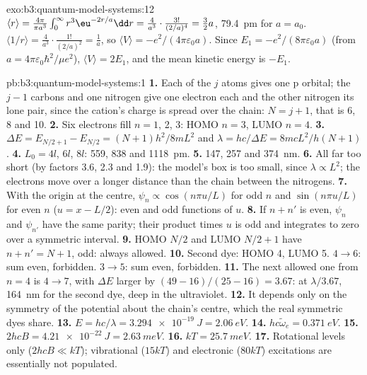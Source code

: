 \begin{solution}{exo:b3:quantum-model-systems:12}
$\langle r\rangle = \frac{4\pi}{\pi a^3}\int_0^\infty r^3\eu^{-2r/a}\dd r =
\frac{4}{a^3}\cdot\frac{3!}{(2/a)^4} = \frac32a$, \qty{79.4}{pm} for $a = a_0$.
$\langle 1/r\rangle = \frac{4}{a^3}\cdot\frac{1!}{(2/a)^2} = \frac1a$, so
$\langle V\rangle = -e^2/(4\pi\varepsilon_0a)$. Since $E_1 =
-e^2/(8\pi\varepsilon_0a)$ (from $a = 4\pi\varepsilon_0\hbar^2/\mu e^2$),
$\langle V\rangle = 2E_1$, and the mean kinetic energy is $-E_1$.
\end{solution}

\begin{solution}{pb:b3:quantum-model-systems:1}
\textbf{1.} Each of the $j$ atoms gives one p orbital; the $j - 1$ carbons and
one nitrogen give one electron each and the other nitrogen its lone pair,
since the cation's charge is spread over the chain: $N = j + 1$, that is 6,
8 and 10.
\textbf{2.} Six electrons fill $n = 1$, 2, 3: HOMO $n = 3$, LUMO $n = 4$.
\textbf{3.} $\Delta E = E_{N/2+1} - E_{N/2} = (N+1)h^2/8mL^2$ and $\lambda =
hc/\Delta E = 8mcL^2/h(N+1)$.
\textbf{4.} $L_0 = 4l$, $6l$, $8l$: 559, 838 and \qty{1118}{pm}.
\textbf{5.} 147, 257 and \qty{374}{nm}.
\textbf{6.} All far too short (by factors 3.6, 2.3 and 1.9): the model's box is too
small, since $\lambda \propto L^2$; the electrons move over a longer
distance than the chain between the nitrogens.
\textbf{7.} With the origin at the centre, $\psi_n \propto \cos(n\pi u/L)$ for
odd $n$ and $\sin(n\pi u/L)$ for even $n$ ($u = x - L/2$): even and odd
functions of $u$.
\textbf{8.} If $n + n'$ is even, $\psi_n$ and $\psi_{n'}$ have the same parity;
their product times $u$ is odd and integrates to zero over a symmetric
interval.
\textbf{9.} HOMO $N/2$ and LUMO $N/2 + 1$ have $n + n' = N + 1$, odd: always
allowed.
\textbf{10.} Second dye: HOMO 4, LUMO 5. $4 \to 6$: sum even, forbidden.
$3 \to 5$: sum even, forbidden.
\textbf{11.} The next allowed one from $n = 4$ is $4 \to 7$, with
$\Delta E$ larger by $(49 - 16)/(25 - 16) = 3.67$: at $\lambda/3.67$,
\qty{164}{nm} for the second dye, deep in the ultraviolet.
\textbf{12.} It depends only on the symmetry of the potential about the
chain's centre, which the real symmetric dyes share.
\textbf{13.} $E = hc/\lambda = \qty{3.294e-19}{J} = \qty{2.06}{eV}$.
\textbf{14.} $hc\tilde\omega_e = \qty{0.371}{eV}$.
\textbf{15.} $2hcB = \qty{4.21e-22}{J} = \qty{2.63}{meV}$.
\textbf{16.} $kT = \qty{25.7}{meV}$.
\textbf{17.} Rotational levels only ($2hcB \ll kT$); vibrational ($15kT$) and
electronic ($80kT$) excitations are essentially not populated.

\end{solution}

